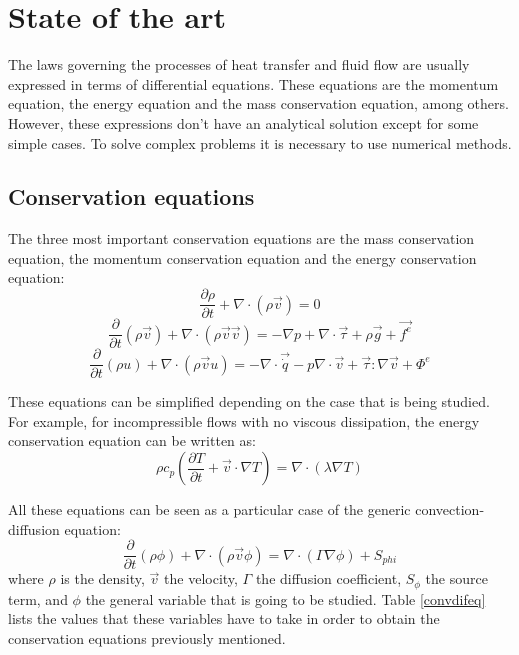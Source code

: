 \chapter{State of the art}

The laws governing the processes of heat transfer and fluid flow are usually expressed in terms of differential equations. These equations are the momentum equation, the energy equation and the mass conservation equation, among others. However, these expressions don’t have an analytical solution except for some simple cases. To solve complex problems it is necessary to use numerical methods.

\section{Conservation equations}
\label{ConservationEquations}
The three most important conservation equations are the mass conservation equation, the momentum conservation equation and the energy conservation equation:
\begin{equation}
\frac{\partial\rho}{\partial t}+\nabla\cdot\left(\rho\vec{v}\right)=0
\end{equation}
\begin{equation}
\frac{\partial}{\partial t}\left(\rho\vec{v}\right)+\nabla\cdot\left(\rho\vec{v}\vec{v}\right)=-\nabla p+\nabla\cdot\vec{\tau}+\rho\vec{g}+\vec{f^{e}}
\end{equation}
\begin{equation}
\frac{\partial}{\partial t}(\rho u)+\nabla\cdot\left(\rho\vec{v}u\right)=-\nabla\cdot\vec{\dot{q}}-p\nabla\cdot\vec{v}+\vec{\tau}:\nabla\vec{v}+\Phi^{e}
\end{equation}

These equations can be simplified depending on the case that is being studied. For example, for incompressible flows with no viscous dissipation, the energy conservation equation can be written as:
\begin{equation}
\rho c_{p}\left(\frac{\partial T}{\partial t}+\vec{v}\cdot\nabla T\right)=\nabla\cdot\left(\lambda\nabla T\right)
\label{EnergyIncompNoVisc}
\end{equation}

All these equations can be seen as a particular case of the generic convection-diffusion equation:
\begin{equation}
\frac{\partial}{\partial t}\left(\rho\phi\right)+\nabla\cdot\left(\rho\vec{v}\phi\right)=\nabla\cdot\left(\Gamma\nabla\phi\right)+S_{phi}
\end{equation}
where $\rho$ is the density, $\vec{v}$ the velocity, $\Gamma$ the diffusion coefficient, $S_{\phi}$ the source term, and $\phi$ the general variable that is going to be studied. Table \ref{convdifeq} lists the values that these variables have to take in order to obtain the conservation equations previously mentioned.

